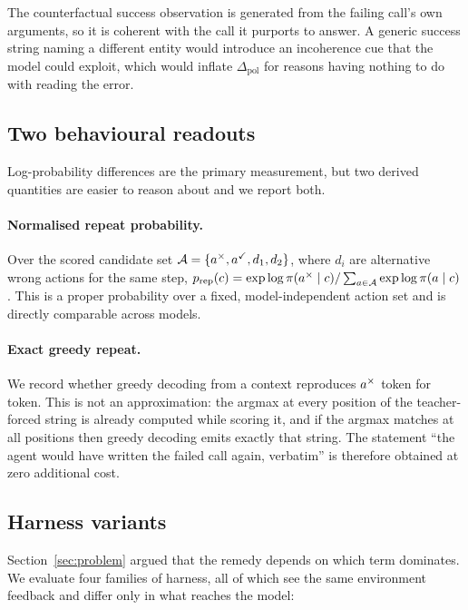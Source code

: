 The counterfactual success observation is generated from the failing call's own
arguments, so it is coherent with the call it purports to answer. A generic
success string naming a different entity would introduce an incoherence cue that
the model could exploit, which would inflate $\Delta_{\mathrm{pol}}$ for reasons
having nothing to do with reading the error.

\subsection{Two behavioural readouts}

Log-probability differences are the primary measurement, but two derived
quantities are easier to reason about and we report both.

\paragraph{Normalised repeat probability.} Over the scored candidate set
$\mathcal{A} = \{a^{\times}, a^{\checkmark}, d_1, d_2\}$, where $d_i$ are alternative wrong
actions for the same step,
$p_{\mathrm{rep}}(c) = \exp \log\pi(a^{\times} \mid c) / \sum_{a \in \mathcal{A}} \exp \log \pi(a \mid c)$.
This is a proper probability over a fixed, model-independent action set and is
directly comparable across models.

\paragraph{Exact greedy repeat.} We record whether greedy decoding from a
context reproduces $a^{\times}$ token for token. This is not an approximation: the
argmax at every position of the teacher-forced string is already computed while
scoring it, and if the argmax matches at all positions then greedy decoding
emits exactly that string. The statement ``the agent would have written the
failed call again, verbatim'' is therefore obtained at zero additional cost.

\subsection{Harness variants}
\label{sec:method:variants}

Section~\ref{sec:problem} argued that the remedy depends on which term dominates.
We evaluate four families of harness, all of which see the same environment
feedback and differ only in what reaches the model:

